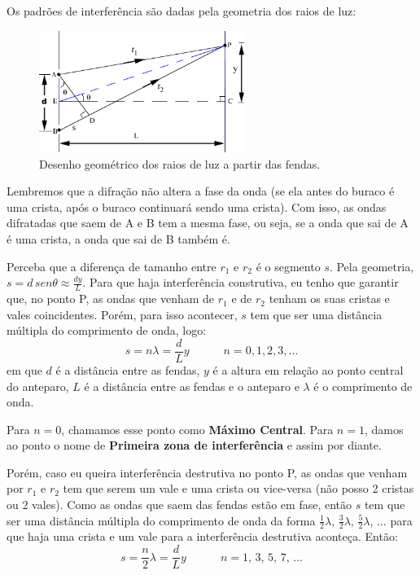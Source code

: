 \documentclass[12pt]{extarticle}
\newcommand{\<}{\langle}
\renewcommand{\>}{\rangle}
\theoremstyle{definition}
\begin{document}
Os padrões de interferência são dadas pela geometria dos raios de luz:
\begin{figure}[H]
    \centering
    \includegraphics[width=0.6\textwidth]{young1.png}
    \caption{Desenho geométrico dos raios de luz a partir das fendas.}
    \label{fig:geometria_young}
\end{figure}
Lembremos que a difração não altera a fase da onda (se ela antes do buraco é uma crista, após o buraco continuará sendo uma crista). Com isso, as ondas difratadas que saem de A e B tem a mesma fase, ou seja, se a onda que sai de A é uma crista, a onda que sai de B também é.

Perceba que a diferença de tamanho entre $r_1$ e $r_2$ é o segmento $s$. Pela geometria, $s=d\, sen \theta \approx \frac{d y}{L}$. Para que haja interferência construtiva, eu tenho que garantir que, no ponto P, as ondas que venham de $r_1$ e de $r_2$ tenham os suas cristas e vales coincidentes. Porém, para isso acontecer, $s$ tem que ser uma distância múltipla do comprimento de onda, logo:
\begin{equation}
    s= n\lambda = \frac{d}{L}y \quad\quad\quad n=0,1,2,3,...
\end{equation}
\noindent em que $d$ é a distância entre as fendas, $y$ é a altura em relação ao ponto central do anteparo, $L$ é a distância entre as fendas e o anteparo e $\lambda$ é o comprimento de onda.

Para $n=0$, chamamos esse ponto como \textbf{Máximo Central}. Para $n=1$, damos ao ponto o nome de \textbf{Primeira zona de interferência} e assim por diante.

Porém, caso eu queira interferência destrutiva no ponto P, as ondas que venham por $r_1$ e $r_2$ tem que serem um vale e uma crista ou vice-versa (não posso 2 cristas ou 2 vales). Como as ondas que saem das fendas estão em fase, então $s$ tem que ser uma distância múltipla do comprimento de onda da forma $\frac{1}{2}\lambda,\,\frac{3}{2}\lambda,\,\frac{5}{2}\lambda,\,\dots$ para que haja uma crista e um vale para a interferência destrutiva aconteça. Então:
\begin{equation}
    s = \frac{n}{2}\lambda = \frac{d}{L}y \quad\quad\quad n=1,\,3,\,5,\,7,\,\dots
\end{equation}
\end{document}
